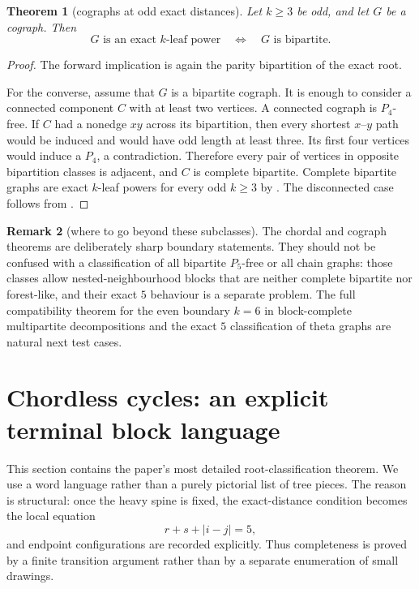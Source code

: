 \documentclass[11pt]{article}
\newtheorem{theorem}{Theorem}[section]
\theoremstyle{definition}
\newtheorem{remark}[theorem]{Remark}
\begin{document}
\begin{theorem}[cographs at odd exact distances]\label{thm:cograph-odd}
Let $k\ge3$ be odd, and let $G$ be a cograph.  Then
\[
 G\text{ is an exact }k\text{-leaf power}
 \quad\Longleftrightarrow\quad
 G\text{ is bipartite}.
\]
\end{theorem}

\begin{proof}
The forward implication is again the parity bipartition of the exact root.

For the converse, assume that $G$ is a bipartite cograph.  It is enough to consider a connected component $C$ with at least two vertices.  A connected cograph is $P_4$-free.  If $C$ had a nonedge $xy$ across its bipartition, then every shortest $x$--$y$ path would be induced and would have odd length at least three.  Its first four vertices would induce a $P_4$, a contradiction.  Therefore every pair of vertices in opposite bipartition classes is adjacent, and $C$ is complete bipartite.  Complete bipartite graphs are exact $k$-leaf powers for every odd $k\ge3$ by .  The disconnected case follows from .
\end{proof}

\begin{remark}[where to go beyond these subclasses]
The chordal and cograph theorems are deliberately sharp boundary statements.  They should not be confused with a classification of all bipartite $P_5$-free or all chain graphs: those classes allow nested-neighbourhood blocks that are neither complete bipartite nor forest-like, and their exact $5$ behaviour is a separate problem.  The full compatibility theorem for the even boundary $k=6$ in block-complete multipartite decompositions and the exact $5$ classification of theta graphs are natural next test cases.
\end{remark}


\section{Chordless cycles: an explicit terminal block language}\label{sec:cycle-correction}

This section contains the paper's most detailed root-classification theorem.  We use a word language rather than a purely pictorial list of tree pieces.  The reason is structural: once the heavy spine is fixed, the exact-distance condition becomes the local equation
\[
 r+s+|i-j|=5,
\]
and endpoint configurations are recorded explicitly.  Thus completeness is proved by a finite transition argument rather than by a separate enumeration of small drawings.
\end{document}
